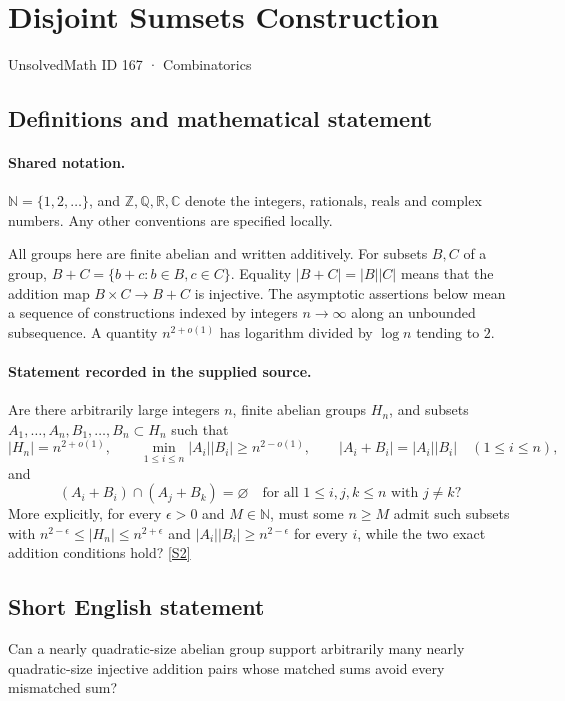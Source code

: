 \documentclass[11pt]{article}
\newcommand{\sref}[2]{\hyperlink{source:#1:#2}{[S#2]}}
\begin{document}
\setcounter{section}{166}
\section{Disjoint Sumsets Construction}\label{167}
{\small\sffamily UnsolvedMath ID 167 · Combinatorics}
\subsection{Definitions and mathematical statement}

\paragraph{Shared notation.}$\mathbb N=\{1,2,\ldots\}$, and $\mathbb Z,\mathbb Q,\mathbb R,\mathbb C$ denote the integers, rationals, reals and complex numbers. Any other conventions are specified locally.


All groups here are finite abelian and written additively. For subsets $B,C$ of a group, $B+C=\{b+c:b\in B,c\in C\}$. Equality $|B+C|=|B||C|$ means that the addition map $B\times C\to B+C$ is injective. The asymptotic assertions below mean a sequence of constructions indexed by integers $n\to\infty$ along an unbounded subsequence. A quantity $n^{2+o(1)}$ has logarithm divided by $\log n$ tending to $2$.
\paragraph{Statement recorded in the supplied source.}
Are there arbitrarily large integers $n$, finite abelian groups $H_n$, and subsets $A_1,\ldots,A_n,B_1,\ldots,B_n\subset H_n$ such that
\[
 |H_n|=n^{2+o(1)},\qquad
 \min_{1\leq i\leq n}|A_i||B_i|\geq n^{2-o(1)},\qquad
 |A_i+B_i|=|A_i||B_i|\quad(1\leq i\leq n),
\]
and
\[
 (A_i+B_i)\cap(A_j+B_k)=\varnothing
 \quad\text{for all }1\leq i,j,k\leq n\text{ with }j\ne k?
\]
More explicitly, for every $\epsilon>0$ and $M\in\mathbb N$, must some $n\geq M$ admit such subsets with $n^{2-\epsilon}\leq|H_n|\leq n^{2+\epsilon}$ and $|A_i||B_i|\geq n^{2-\epsilon}$ for every $i$, while the two exact addition conditions hold? \sref{167}{2}
\subsection{Short English statement}
Can a nearly quadratic-size abelian group support arbitrarily many nearly quadratic-size injective addition pairs whose matched sums avoid every mismatched sum?
\end{document}
